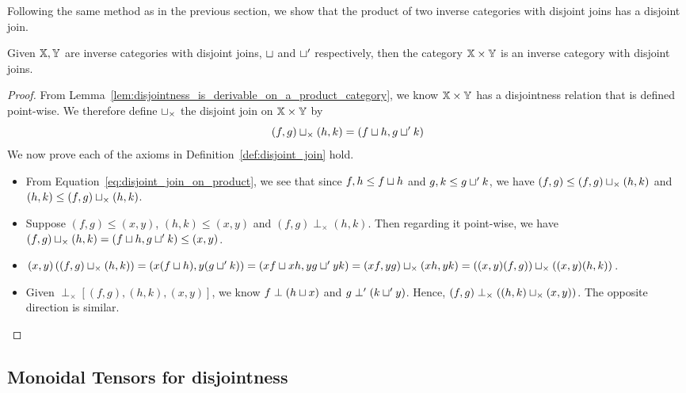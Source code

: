 Following the same method as in the previous section, we show that the product of two
inverse categories with disjoint joins has a disjoint join.
\begin{lemma}\label{lem:disjoint_join_is_in_product_category}
  Given $\mathbb{X}, \mathbb{Y}$ are inverse categories with disjoint joins, $\sqcup$ and $\sqcup'$ respectively,
  then the category $\mathbb{X} \times \mathbb{Y}$ is an inverse category with disjoint joins.
\end{lemma}
\begin{proof}
  From Lemma~\ref{lem:disjointness_is_derivable_on_a_product_category}, we know $\mathbb{X}\times\mathbb{Y}$ has a
  disjointness relation that is defined point-wise.  We therefore define $\sqcup_{\times}$ the
  disjoint join on $\mathbb{X}\times\mathbb{Y}$ by
  \begin{equation}
    (f,g)\sqcup_{\times}(h,k) = (f \sqcup h, g \sqcup' k) \label{eq:disjoint_join_on_product}
  \end{equation}
  We now prove each of the axioms in Definition~\ref{def:disjoint_join} hold.
  \begin{itemize}
    \item [\axiom{DJ}{1}] From Equation~\eqref{eq:disjoint_join_on_product}, we see that since
      $f,h \le f \sqcup h$ and $g,k \le g \sqcup' k$, we have $(f,g) \le (f,g)\sqcup_{\times}(h,k)$
      and  $(h,k) \le (f,g)\sqcup_{\times}(h,k)$.
    \item [\axiom{DJ}{2}] Suppose $(f,g) \le (x,y)$, $(h,k) \le (x,y)$ and $(f,g) \perp_{\times}
      (h,k)$. Then regarding it point-wise, we have $(f,g)\sqcup_{\times}(h,k) = (f \sqcup h, g
      \sqcup' k) \le (x,y)$.
    \item [\axiom{DJ}{3}] $(x,y)\left((f,g)\sqcup_{\times}(h,k)\right) = (x(f \sqcup h), y(g
      \sqcup' k)) = (x f \sqcup x h, y g \sqcup' y k) = (x f,y g)\sqcup_{\times}(x h,y k) =
      ((x,y)(f,g))\sqcup_{\times}((x,y)(h,k))$.
    \item [\axiom{DJ}{4}] Given $\perp_{\times}\!\![(f,g),(h,k),(x,y)]$, we know $f \perp (h\sqcup
      x)$ and $g \perp' (k\sqcup' y)$. Hence, $(f,g) \perp_{\times}((h,k)\sqcup_{\times}(x,y))$. The
      opposite direction is similar.
  \end{itemize}
\end{proof}


\subsection{Monoidal Tensors for disjointness} %
\label{sub:tensors_for_disjointness}

